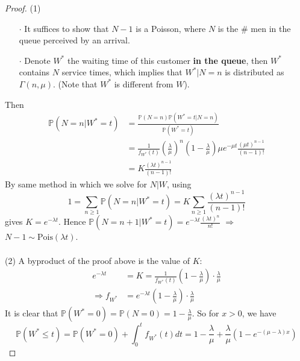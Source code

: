 \documentclass[a4paper, 10pt]{article}
\theoremstyle{definition}
\theoremstyle{hSol}
\begin{document}
\begin{proof} (1) 
\begin{itemize}
  \item[$\cdot$] It suffices to show that $N-1$ is a Poisson, where $N$ is the \# men in the queue perceived by an arrival. 
  \item[$\cdot$] Denote $W^*$ the waiting time of this customer \textbf{in the queue}, then $W^*$ contains $N$ service times, which implies that $W^*|N=n$ is distributed as $\Gamma(n, \mu)$. (Note that $W^*$ is different from $W$).
\end{itemize}
Then 
\begin{equation}
  \begin{split}
    \mathbb{P}\left(N=n|W^*=t\right) &= \frac{\mathbb{P}\left(N=n\right)\mathbb{P}\left(W^*=t|N=n\right)}{\mathbb{P}\left(W^*=t\right)} \\
    &= \frac{1}{f_{W^*}(t)}\left(\frac{\lambda}{\mu}\right)^n(1-\frac{\lambda}{\mu}) \mu e^{-\mu t}\frac{(\mu t)^{n-1}}{(n-1)!} \\
    &= K  \frac{(\lambda t)^{n-1}}{(n-1)!}
  \end{split}
\end{equation}
By same method in which we solve for $N|W$, using
\begin{equation}
  1 = \sum_{n\geq 1} \mathbb{P}\left(N=n|W^*=t\right) = K \sum_{n\geq 1} \frac{(\lambda t)^{n-1}}{(n-1)!}
\end{equation}
gives $K=e^{-\lambda t}$. Hence $\mathbb{P}\left(N=n+1|W^*=t\right) = e^{-\lambda t} \frac{(\lambda t)^{n}}{n!}$ $\Rightarrow$ $N-1\sim\text{Pois}(\lambda t)$. \\
~\\
(2) A byproduct of the proof above is the value of $K$:
\begin{equation}
  \begin{split}
     e^{-\lambda t} &= K = \frac{1}{f_{W^*}(t)}(1-\frac{\lambda}{\mu})\cdot\frac{\lambda}{\mu} \\
     \Rightarrow f_{W^*} &= e^{-\lambda t}(1-\frac{\lambda}{\mu})\cdot\frac{\lambda}{\mu}
  \end{split}
\end{equation} 
It is clear that $\mathbb{P}\left(W^*=0\right)=\mathbb{P}\left(N=0\right)=1-\frac{\lambda}{\mu}$. So for $x>0$, we have
\begin{equation}
  \mathbb{P}\left(W^* \leq t\right) = \mathbb{P}\left(W^*=0\right) + \int_0^t f_{W^*}(t)dt = 1-\frac{\lambda}{\mu} + \frac{\lambda}{\mu}(1-e^{-(\mu- \lambda)x})
\end{equation}

\end{proof}
\end{document}
